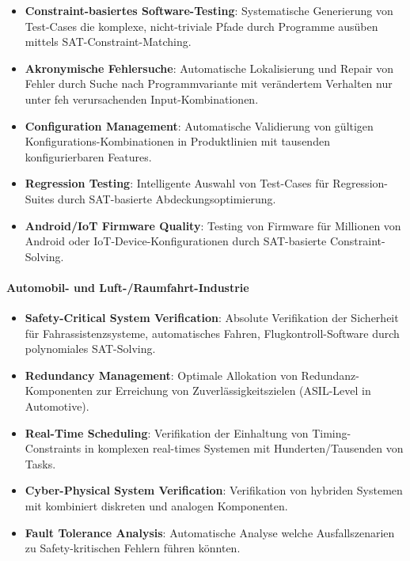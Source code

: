 ﻿\documentclass[a4paper,12pt]{article}
\theoremstyle{definition}
\begin{document}
\begin{itemize}
	\item \textbf{Constraint-basiertes Software-Testing}: Systematische Generierung von Test-Cases die komplexe, nicht-triviale Pfade durch Programme ausüben mittels SAT-Constraint-Matching.
	
	\item \textbf{Akronymische Fehlersuche}: Automatische Lokalisierung und Repair von Fehler durch Suche nach Programmvariante mit verändertem Verhalten nur unter feh verursachenden Input-Kombinationen.
	
	\item \textbf{Configuration Management}: Automatische Validierung von gültigen Konfigurations-Kombinationen in Produktlinien mit tausenden konfigurierbaren Features.
	
	\item \textbf{Regression Testing}: Intelligente Auswahl von Test-Cases für Regression-Suites durch SAT-basierte Abdeckungsoptimierung.
	
	\item \textbf{Android/IoT Firmware Quality}: Testing von Firmware für Millionen von Android oder IoT-Device-Konfigurationen durch SAT-basierte Constraint-Solving.
\end{itemize}

\paragraph{Automobil- und Luft-/Raumfahrt-Industrie}

\begin{itemize}
	\item \textbf{Safety-Critical System Verification}: Absolute Verifikation der Sicherheit für Fahrassistenzsysteme, automatisches Fahren, Flugkontroll-Software durch polynomiales SAT-Solving.
	
	\item \textbf{Redundancy Management}: Optimale Allokation von Redundanz-Komponenten zur Erreichung von Zuverlässigkeitszielen (ASIL-Level in Automotive).
	
	\item \textbf{Real-Time Scheduling}: Verifikation der Einhaltung von Timing-Constraints in komplexen real-times Systemen mit Hunderten/Tausenden von Tasks.
	
	\item \textbf{Cyber-Physical System Verification}: Verifikation von hybriden Systemen mit kombiniert diskreten und analogen Komponenten.
	
	\item \textbf{Fault Tolerance Analysis}: Automatische Analyse welche Ausfallszenarien zu Safety-kritischen Fehlern führen könnten.
\end{itemize}
\end{document}
